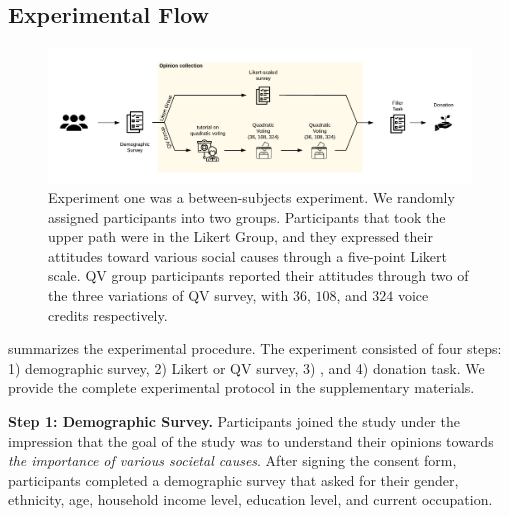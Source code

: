 \subsection{Experimental Flow}
\begin{figure}[htpb]
    \centering
    \includegraphics[width=\textwidth, keepaspectratio=true]{content/image/exp1_flow.pdf}
    \caption{
        Experiment one was a between-subjects experiment. We randomly assigned participants into two groups. Participants that took the upper path were in the Likert Group, and they expressed their attitudes toward various social causes through a five-point Likert scale. QV group participants reported their attitudes through two of the three variations of QV survey, with $36$, $108$, and $324$ voice credits respectively.
    }
    \label{fig:exp1_image_flow}
\end{figure}

 summarizes the experimental procedure. The experiment consisted of four steps: 1) demographic survey, 2) Likert or QV survey, 3) , and 4) donation task. We provide the complete experimental protocol in the supplementary materials.



\textbf{Step 1: Demographic Survey.} Participants joined the study under the impression that the goal of the study was to understand their opinions towards \textit{the importance of various societal causes}. After signing the consent form, participants completed a demographic survey that asked for their gender, ethnicity, age, household income level, education level, and current occupation.


